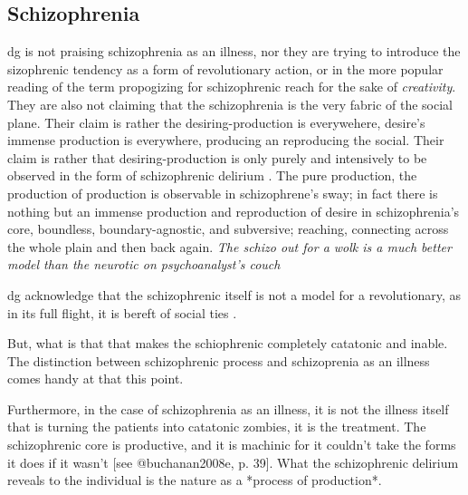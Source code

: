 \subsection{Schizophrenia}


\gls{dg} is not praising schizophrenia as an illness, nor they are trying to introduce the
sizophrenic tendency as a form of revolutionary action, or in the more popular
reading of the term propogizing for schizophrenic reach for the sake of
\textit{creativity}. They are also not
claiming that the schizophrenia is the very fabric of the social plane. Their
claim is rather the desiring-production is everywehere, desire's immense
production is everywhere, producing an reproducing the social. Their claim is
rather that desiring-production is only purely and intensively to be observed
in the form of schizophrenic delirium \parencite[43]{buchanan2008b}. The pure
production, the production of production is observable in schizophrene's sway;
in fact there is nothing but an immense production and reproduction of desire
in schizophrenia's core, boundless, boundary-agnostic, and subversive;
reaching, connecting across the whole plain and then back again. \textit{The
	schizo out for a wolk is a much better model than the neurotic on
	psychoanalyst's couch}

\gls{dg}  acknowledge that the schizophrenic itself is  not a model for a revolutionary, as in its full flight, it is bereft of social ties \parencite[50]{buchanan2008b}.

But, what is that that makes the schiophrenic completely catatonic and inable.
The distinction between schizophrenic process and schizoprenia as an illness
comes handy at that this point.


\begin{orangebox}
	Furthermore, in the case of schizophrenia as an illness, it is not the illness itself that is turning the patients into catatonic zombies, it is the treatment. The schizophrenic core is productive, and it is machinic for it couldn't take the forms it does if it wasn't [see @buchanan2008e, p. 39]. What the schizophrenic delirium reveals to the individual is the nature as a *process of production*.
\end{orangebox}

